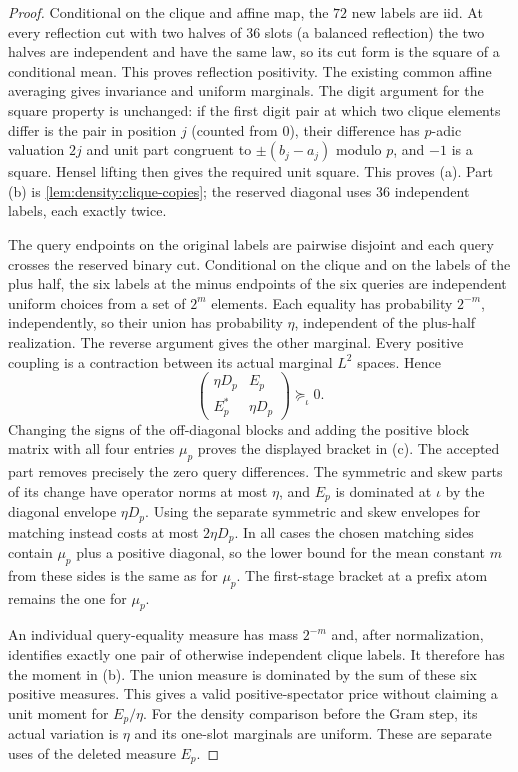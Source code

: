 \begin{proof}
Conditional on the clique and affine map, the $72$ new labels
are iid. At every reflection cut with two halves of $36$ slots
(a balanced reflection) the two halves are independent and have
the same law, so its cut form is the square of a conditional
mean.
This proves reflection positivity. The existing common affine averaging
gives invariance and uniform marginals. The digit argument for the square
property is unchanged: if the first digit pair at which two
clique elements differ is the pair in position $j$ (counted from
$0$), their difference has $p$-adic valuation $2j$ and unit part
congruent to $\pm(b_j-a_j)$ modulo $p$, and $-1$ is a
square. Hensel lifting then gives the required unit square. This proves
(a). Part (b) is \cref{lem:density:clique-copies}; the reserved diagonal
uses $36$ independent labels, each exactly twice.

The query endpoints on the original labels are pairwise
disjoint and each query crosses the reserved binary cut.
Conditional on the clique and on the labels of the plus half,
the six labels at the minus endpoints of the six queries are
independent uniform choices from a set of $2^m$ elements. Each equality has probability $2^{-m}$,
independently, so their union has probability $\eta$, independent of the
plus-half realization. The reverse argument gives the other marginal.
Every positive coupling is a contraction between its actual marginal
$L^2$ spaces. Hence
\[
 \begin{pmatrix}\eta D_p&E_p\\E_p^*&\eta D_p\end{pmatrix}
 \succeq_\iota0.
\]
Changing the signs of the off-diagonal blocks and adding the positive
block matrix with all four entries $\mu_p$ proves the displayed bracket
in (c). The accepted part removes precisely the zero query differences.
The symmetric and skew parts of its change have operator norms at most
$\eta$, and $E_p$ is dominated at $\iota$ by the diagonal envelope $\eta D_p$.
Using the separate symmetric and skew envelopes for matching instead
costs at most $2\eta D_p$. In all cases the chosen matching sides contain
$\mu_p$ plus a positive diagonal, so the lower bound for the mean constant $m$ from these sides is the same as for $\mu_p$.
The first-stage bracket at a prefix atom remains the one for $\mu_p$.

An individual query-equality measure has mass $2^{-m}$ and, after
normalization, identifies exactly one pair of otherwise independent
clique labels. It therefore has the moment in (b). The union measure is
dominated by the sum of these six positive measures. This gives a valid
positive-spectator price without claiming a unit moment for $E_p/\eta$.
For the density comparison before the Gram step, its actual variation
is $\eta$ and its one-slot marginals are uniform. These are separate uses of the deleted measure $E_p$.


\end{proof}
